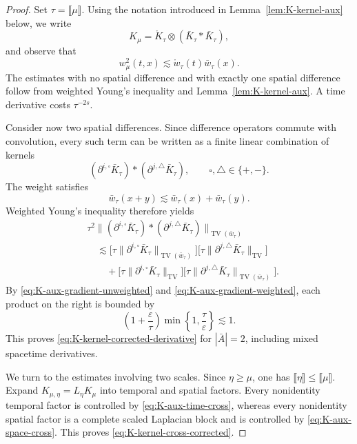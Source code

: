 \documentclass{article}
\numberwithin{equation}{section}
\theoremstyle{plain}
\theoremstyle{definition}
\begin{document}
\begin{proof}
	Set \(\tau=\llbracket\mu\rrbracket\). Using the notation introduced in Lemma~\ref{lem:K-kernel-aux} below, we write
	\[
		K_\mu=\mathring K_\tau\otimes(\bar K_\tau*\bar K_\tau),
	\]
	and observe that
	\[
	w_\mu^2(t,x)
	\lesssim
		\mathring w_\tau(t)\bar w_\tau(x).
	\]
	The estimates with no spatial difference and with exactly one spatial
	difference follow from weighted Young's inequality and
	Lemma~\ref{lem:K-kernel-aux}.  A time derivative costs
	\(\tau^{-2s}\).
	
	Consider now two spatial differences.  Since difference operators commute
	with convolution, every such term can be written as a finite linear
	combination of kernels
	\[
	(\partial^{i,\square}\bar K_\tau)
	*
	(\partial^{j,\triangle}\bar K_\tau),
	\qquad
	\square,\triangle\in\{+,-\}.
	\]
	The weight satisfies
	\[
	\bar w_\tau(x+y)
	\lesssim
	\bar w_\tau(x)+\bar w_\tau(y).
	\]
	Weighted Young's inequality therefore yields
	\[
	\begin{aligned}
		&\tau^2
		\|
		(\partial^{i,\square}\bar K_\tau)
		*
		(\partial^{j,\triangle}\bar K_\tau)
		\|_{\operatorname{TV}(\bar w_\tau)}
		\\
		&\quad\lesssim
		\bigl[
		\tau\|\partial^{i,\square}\bar K_\tau\|
		_{\operatorname{TV}(\bar w_\tau)}
		\bigr]
		\bigl[
		\tau\|\partial^{j,\triangle}\bar K_\tau\|
		_{\operatorname{TV}}
		\bigr]
		\\
		&\qquad+
		\bigl[
		\tau\|\partial^{i,\square}\bar K_\tau\|
		_{\operatorname{TV}}
		\bigr]
		\bigl[
		\tau\|\partial^{j,\triangle}\bar K_\tau\|
		_{\operatorname{TV}(\bar w_\tau)}
		\bigr].
	\end{aligned}
	\]
	By \eqref{eq:K-aux-gradient-unweighted} and
	\eqref{eq:K-aux-gradient-weighted}, each product on the right is bounded by
	\[
	\left(
	1+\frac{\varepsilon}{\tau}
	\right)
	\min\left\{1,\frac{\tau}{\varepsilon}\right\}
	\lesssim1.
	\]
	This proves \eqref{eq:K-kernel-corrected-derivative} for
	\(|\bar A|=2\), including mixed spacetime derivatives.
	
	We turn to the estimates involving two scales.  Since
	\(\eta\geq\mu\), one has
	\(\llbracket\eta\rrbracket\leq\llbracket\mu\rrbracket\).
	Expand \(K_{\mu,\eta}=L_\eta K_\mu\) into temporal and spatial factors.
	Every nonidentity temporal factor is controlled by
	\eqref{eq:K-aux-time-cross}, whereas every nonidentity spatial factor is a complete
	scaled Laplacian block and is controlled by
	\eqref{eq:K-aux-space-cross}.  This proves
	\eqref{eq:K-kernel-cross-corrected}.
	

\end{proof}
\end{document}
